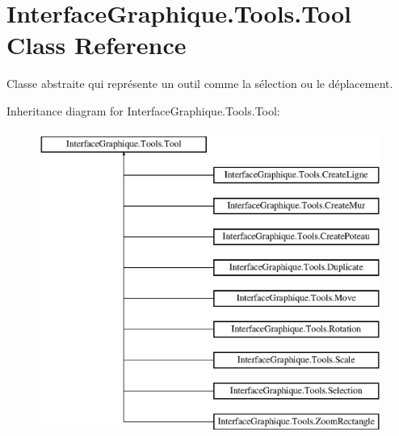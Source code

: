 \hypertarget{class_interface_graphique_1_1_tools_1_1_tool}{}\section{Interface\+Graphique.\+Tools.\+Tool Class Reference}
\label{class_interface_graphique_1_1_tools_1_1_tool}


Classe abstraite qui représente un outil comme la sélection ou le déplacement.  


Inheritance diagram for Interface\+Graphique.\+Tools.\+Tool\+:\begin{figure}[H]
\begin{center}
\leavevmode
\includegraphics[height=10.000000cm]{class_interface_graphique_1_1_tools_1_1_tool}
\end{center}
\end{figure}
